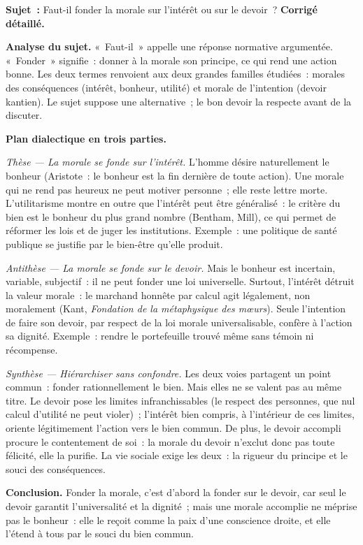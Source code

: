 \documentclass[11pt]{article}
\begin{document}
\begin{exoresolu}
\textbf{Sujet~:} Faut-il fonder la morale sur l'intérêt ou sur le devoir~?
\tcblower
\textbf{Corrigé détaillé.}

\textbf{Analyse du sujet.} «~Faut-il~» appelle une réponse normative argumentée. «~Fonder~» signifie~: donner à la morale son principe, ce qui rend une action bonne. Les deux termes renvoient aux deux grandes familles étudiées~: morales des conséquences (intérêt, bonheur, utilité) et morale de l'intention (devoir kantien). Le sujet suppose une alternative~; le bon devoir la respecte avant de la discuter.

\textbf{Plan dialectique en trois parties.}

\emph{Thèse — La morale se fonde sur l'intérêt.} L'homme désire naturellement le bonheur (Aristote~: le bonheur est la fin dernière de toute action). Une morale qui ne rend pas heureux ne peut motiver personne~; elle reste lettre morte. L'utilitarisme montre en outre que l'intérêt peut être généralisé~: le critère du bien est le bonheur du plus grand nombre (Bentham, Mill), ce qui permet de réformer les lois et de juger les institutions. Exemple~: une politique de santé publique se justifie par le bien-être qu'elle produit.

\emph{Antithèse — La morale se fonde sur le devoir.} Mais le bonheur est incertain, variable, subjectif~: il ne peut fonder une loi universelle. Surtout, l'intérêt détruit la valeur morale~: le marchand honnête par calcul agit légalement, non moralement (Kant, \emph{Fondation de la métaphysique des mœurs}). Seule l'intention de faire son devoir, par respect de la loi morale universalisable, confère à l'action sa dignité. Exemple~: rendre le portefeuille trouvé même sans témoin ni récompense.

\emph{Synthèse — Hiérarchiser sans confondre.} Les deux voies partagent un point commun~: fonder rationnellement le bien. Mais elles ne se valent pas au même titre. Le devoir pose les limites infranchissables (le respect des personnes, que nul calcul d'utilité ne peut violer)~; l'intérêt bien compris, à l'intérieur de ces limites, oriente légitimement l'action vers le bien commun. De plus, le devoir accompli procure le contentement de soi~: la morale du devoir n'exclut donc pas toute félicité, elle la purifie. La vie sociale exige les deux~: la rigueur du principe et le souci des conséquences.

\textbf{Conclusion.} Fonder la morale, c'est d'abord la fonder sur le devoir, car seul le devoir garantit l'universalité et la dignité~; mais une morale accomplie ne méprise pas le bonheur~: elle le reçoit comme la paix d'une conscience droite, et elle l'étend à tous par le souci du bien commun.
\end{exoresolu}
\end{document}
